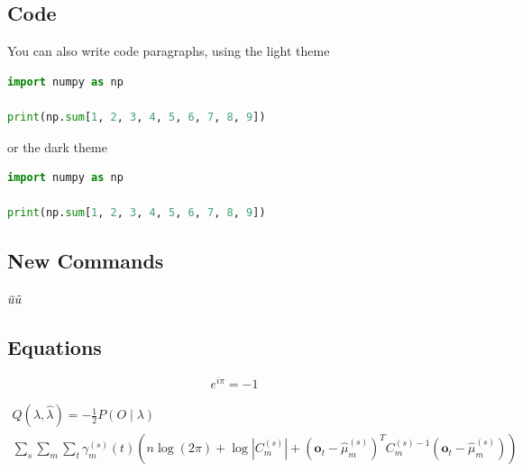 \subsection{Code}
You can also write code paragraphs, using the light theme

\begin{lstlisting}[language=Python]
import numpy as np

print(np.sum[1, 2, 3, 4, 5, 6, 7, 8, 9])
\end{lstlisting}

or the dark theme

\begin{lstlisting}[language=Python, style=dark]
import numpy as np

print(np.sum[1, 2, 3, 4, 5, 6, 7, 8, 9])
\end{lstlisting}

\subsection{New Commands}
${}\mkern3mu\overline{\mkern-3muu}{}\mkern3mu\tilde{\mkern-3muu}$

\subsection{Equations}
\begin{equation}
	e^{i\pi} = -1
\end{equation}

\begin{equation}
	\begin{split}
		Q(\lambda,\hat{\lambda}) = -\frac{1}{2} P{(O \mid \lambda )} \\\sum_s \sum_m \sum_t \gamma_m^{(s)} (t) \left( n \log(2 \pi ) + \log \left| C_m^{(s)} \right| + \left( \mathbf{o}_t - \hat{\mu}_m^{(s)} \right) ^T C_m^{(s)-1} \left(\mathbf{o}_t - \hat{\mu}_m^{(s)}\right) \right)
	\end{split}
\end{equation}